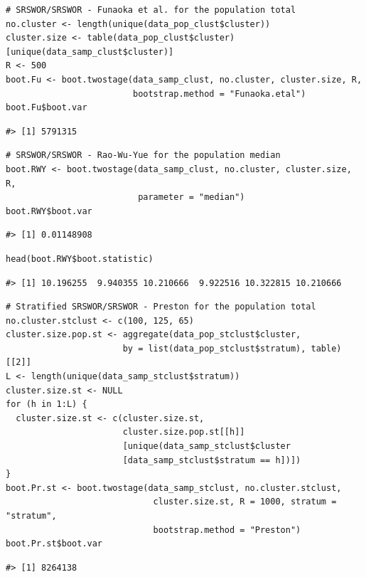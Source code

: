 \begin{verbatim}
# SRSWOR/SRSWOR - Funaoka et al. for the population total
no.cluster <- length(unique(data_pop_clust$cluster))
cluster.size <- table(data_pop_clust$cluster)[unique(data_samp_clust$cluster)]
R <- 500
boot.Fu <- boot.twostage(data_samp_clust, no.cluster, cluster.size, R, 
                         bootstrap.method = "Funaoka.etal")
boot.Fu$boot.var
\end{verbatim}

\begin{verbatim}
#> [1] 5791315
\end{verbatim}

\begin{verbatim}
# SRSWOR/SRSWOR - Rao-Wu-Yue for the population median
boot.RWY <- boot.twostage(data_samp_clust, no.cluster, cluster.size, R,
                          parameter = "median")
boot.RWY$boot.var
\end{verbatim}

\begin{verbatim}
#> [1] 0.01148908
\end{verbatim}

\begin{verbatim}
head(boot.RWY$boot.statistic)
\end{verbatim}

\begin{verbatim}
#> [1] 10.196255  9.940355 10.210666  9.922516 10.322815 10.210666
\end{verbatim}

\begin{verbatim}
# Stratified SRSWOR/SRSWOR - Preston for the population total
no.cluster.stclust <- c(100, 125, 65)
cluster.size.pop.st <- aggregate(data_pop_stclust$cluster,
                       by = list(data_pop_stclust$stratum), table)[[2]]
L <- length(unique(data_samp_stclust$stratum))
cluster.size.st <- NULL
for (h in 1:L) {
  cluster.size.st <- c(cluster.size.st,
                       cluster.size.pop.st[[h]]
                       [unique(data_samp_stclust$cluster
                       [data_samp_stclust$stratum == h])])
}
boot.Pr.st <- boot.twostage(data_samp_stclust, no.cluster.stclust,
                             cluster.size.st, R = 1000, stratum = "stratum",
                             bootstrap.method = "Preston")
boot.Pr.st$boot.var
\end{verbatim}

\begin{verbatim}
#> [1] 8264138
\end{verbatim}

